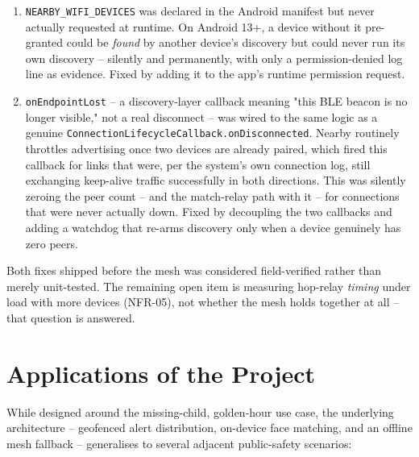 \documentclass[12pt,a4paper,oneside]{report}
\newcommand{\code}[1]{\texttt{#1}}
\begin{document}
\begin{enumerate}
  \item \code{NEARBY\_WIFI\_DEVICES} was declared in the Android manifest
        but never actually requested at runtime. On Android 13+, a device
        without it pre-granted could be \emph{found} by another device's
        discovery but could never run its own discovery -- silently and
        permanently, with only a permission-denied log line as evidence.
        Fixed by adding it to the app's runtime permission request.
  \item \code{onEndpointLost} -- a discovery-layer callback meaning "this
        BLE beacon is no longer visible," not a real disconnect -- was
        wired to the same logic as a genuine
        \code{ConnectionLifecycleCallback.onDisconnected}. Nearby routinely
        throttles advertising once two devices are already paired, which
        fired this callback for links that were, per the system's own
        connection log, still exchanging keep-alive traffic successfully
        in both directions. This was silently zeroing the peer count --
        and the match-relay path with it -- for connections that were
        never actually down. Fixed by decoupling the two callbacks and
        adding a watchdog that re-arms discovery only when a device
        genuinely has zero peers.
\end{enumerate}

Both fixes shipped before the mesh was considered field-verified rather
than merely unit-tested. The remaining open item is measuring hop-relay
\emph{timing} under load with more devices (NFR-05), not whether the mesh
holds together at all -- that question is answered.

\chapter{Applications of the Project}

While designed around the missing-child, golden-hour use case, the
underlying architecture -- geofenced alert distribution, on-device face
matching, and an offline mesh fallback -- generalises to several adjacent
public-safety scenarios:
\end{document}
